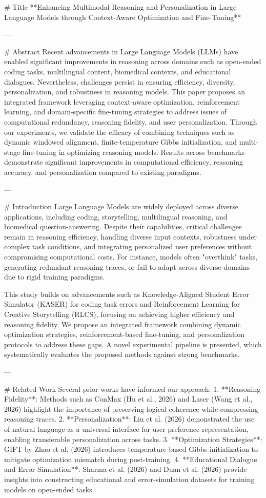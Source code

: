 # Title  
**Enhancing Multimodal Reasoning and Personalization in Large Language Models through Context-Aware Optimization and Fine-Tuning**

---

# Abstract  
Recent advancements in Large Language Models (LLMs) have enabled significant improvements in reasoning across domains such as open-ended coding tasks, multilingual content, biomedical contexts, and educational dialogues. Nevertheless, challenges persist in ensuring efficiency, diversity, personalization, and robustness in reasoning models. This paper proposes an integrated framework leveraging context-aware optimization, reinforcement learning, and domain-specific fine-tuning strategies to address issues of computational redundancy, reasoning fidelity, and user personalization. Through our experiments, we validate the efficacy of combining techniques such as dynamic windowed alignment, finite-temperature Gibbs initialization, and multi-stage fine-tuning in optimizing reasoning models. Results across benchmarks demonstrate significant improvements in computational efficiency, reasoning accuracy, and personalization compared to existing paradigms.

---

# Introduction  
Large Language Models are widely deployed across diverse applications, including coding, storytelling, multilingual reasoning, and biomedical question-answering. Despite their capabilities, critical challenges remain in reasoning efficiency, handling diverse input contexts, robustness under complex task conditions, and integrating personalized user preferences without compromising computational costs. For instance, models often "overthink" tasks, generating redundant reasoning traces, or fail to adapt across diverse domains due to rigid training paradigms.

This study builds on advancements such as Knowledge-Aligned Student Error Simulator (KASER) for coding task errors and Reinforcement Learning for Creative Storytelling (RLCS), focusing on achieving higher efficiency and reasoning fidelity. We propose an integrated framework combining dynamic optimization strategies, reinforcement-based fine-tuning, and personalization protocols to address these gaps. A novel experimental pipeline is presented, which systematically evaluates the proposed methods against strong benchmarks.

---

# Related Work  
Several prior works have informed our approach:  
1. **Reasoning Fidelity**: Methods such as ConMax (Hu et al., 2026) and Laser (Wang et al., 2026) highlight the importance of preserving logical coherence while compressing reasoning traces.  
2. **Personalization**: Liu et al. (2026) demonstrated the use of natural language as a universal interface for user preference representation, enabling transferable personalization across tasks.  
3. **Optimization Strategies**: GIFT by Zhao et al. (2026) introduces temperature-based Gibbs initialization to mitigate optimization mismatch during post-training.  
4. **Educational Dialogue and Error Simulation**: Sharma et al. (2026) and Duan et al. (2026) provide insights into constructing educational and error-simulation datasets for training models on open-ended tasks.  

